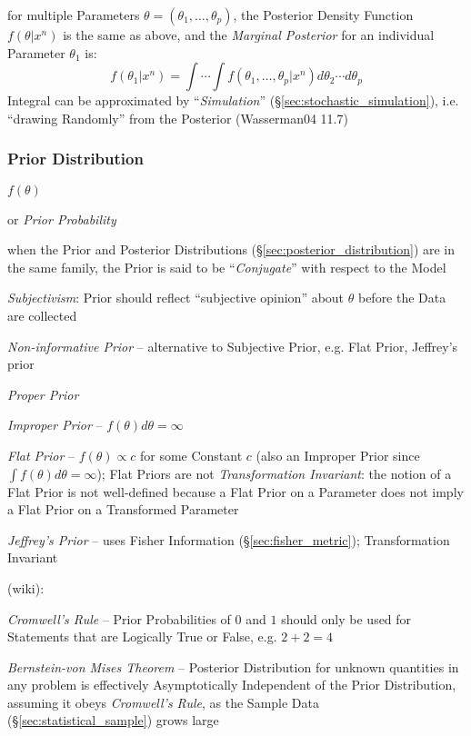 for multiple Parameters $\theta = (\theta_1, \ldots, \theta_p)$, the Posterior
Density Function $f(\theta|x^n)$ is the same as above, and the \emph{Marginal
  Posterior} for an individual Parameter $\theta_1$ is:
\[
  f(\theta_1 | x^n) =
    \int\cdots\int f(\theta_1,\ldots,\theta_p | x^n) d\theta_2 \cdots d\theta_p
\]
Integral can be approximated by ``\emph{Simulation}''
(\S\ref{sec:stochastic_simulation}), i.e. ``drawing Randomly'' from the
Posterior (Wasserman04 11.7)



\subsubsection{Prior Distribution}\label{sec:prior_distribution}

$f(\theta)$

or \emph{Prior Probability}

when the Prior and Posterior Distributions (\S\ref{sec:posterior_distribution})
are in the same family, the Prior is said to be ``\emph{Conjugate}'' with
respect to the Model

\emph{Subjectivism}: Prior should reflect ``subjective opinion'' about $\theta$
before the Data are collected

\emph{Non-informative Prior} -- alternative to Subjective Prior, e.g. Flat
Prior, Jeffrey's prior

\emph{Proper Prior}

\emph{Improper Prior} -- $f(\theta) d\theta = \infty$

\emph{Flat Prior} -- $f(\theta) \propto c$ for some Constant $c$ (also an
Improper Prior since $\int f(\theta) d\theta = \infty$); Flat Priors are not
\emph{Transformation Invariant}: the notion of a Flat Prior is not well-defined
because a Flat Prior on a Parameter does not imply a Flat Prior on a Transformed
Parameter

\emph{Jeffrey's Prior} -- uses Fisher Information (\S\ref{sec:fisher_metric});
Transformation Invariant

(wiki):

\emph{Cromwell's Rule} -- Prior Probabilities of $0$ and $1$ should only be used
for Statements that are Logically True or False, e.g. $2+2 = 4$

\emph{Bernstein-von Mises Theorem} -- Posterior Distribution for unknown
quantities in any problem is effectively Asymptotically Independent of the Prior
Distribution, assuming it obeys \emph{Cromwell's Rule}, as the Sample Data
(\S\ref{sec:statistical_sample}) grows large

